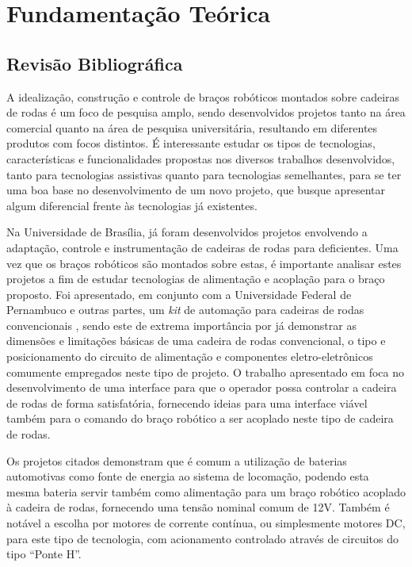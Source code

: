 
\chapter{Fundamentação Teórica\label{chap:FundamentacaoMatematica}}



\section{Revisão Bibliográfica}
\label{sec:revisaobib}

A idealização, construção e controle de braços robóticos montados sobre cadeiras de rodas é um foco de pesquisa amplo, 
sendo desenvolvidos projetos tanto na área comercial quanto na área de 
pesquisa universitária, resultando em diferentes produtos com focos distintos. 
É interessante estudar os tipos de tecnologias, características e funcionalidades
propostas nos diversos trabalhos desenvolvidos, tanto para tecnologias 
assistivas quanto para tecnologias semelhantes, para se ter uma boa base
no desenvolvimento de um novo projeto, que busque apresentar algum 
diferencial frente às tecnologias já existentes.

Na Universidade de Brasília, já foram desenvolvidos projetos envolvendo a adaptação, controle e instrumentação de cadeiras de rodas para deficientes. 
Uma vez que os braços robóticos são montados sobre estas, é importante analisar estes projetos a fim de estudar tecnologias de alimentação e acoplação para o braço 
proposto. Foi apresentado, em conjunto com a Universidade Federal de Pernambuco e outras partes, um \textit{kit} de automação para cadeiras de rodas convencionais 
\cite{vidal2010desenvolvimento}, sendo este de extrema importância por já demonstrar as dimensões e limitações básicas de uma cadeira de rodas convencional, 
o tipo e posicionamento do circuito de alimentação e componentes eletro-eletrônicos comumente empregados neste tipo de projeto.
O trabalho apresentado em \cite{francisco2019interface} foca no desenvolvimento de uma interface para que o operador possa controlar a cadeira de rodas
de forma satisfatória, fornecendo ideias para uma interface viável também para o comando do braço robótico a ser acoplado neste tipo de cadeira de rodas.

Os projetos citados demonstram que é comum a utilização de baterias 
automotivas como fonte de energia ao sistema de locomação, podendo esta mesma bateria
servir também como alimentação para um braço robótico acoplado à cadeira 
de rodas, fornecendo uma tensão nominal comum de 12V.
Também é notável a escolha por motores de corrente contínua, ou simplesmente
motores DC, para este tipo de tecnologia, com acionamento controlado através de 
circuitos do tipo ``Ponte H''.

